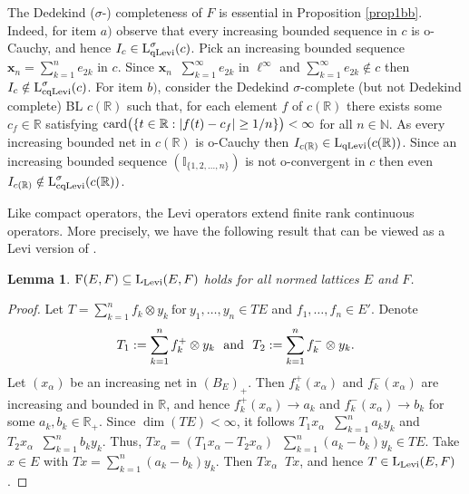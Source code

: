 \documentclass[10pt]{article}
\makeatletter
\newtheorem{lemma}[theorem]{Lemma}
\DeclareMathOperator{\convo}{\xrightarrow[]{o}}
\renewcommand{\subsection}{\@startsection{subsection}{1}
{0pt}{3.25ex plus 1ex minus.2ex}{-1em}{\normalfont\normalsize\bf}}
\makeatother
\begin{document}
{{{\noindent
The Dedekind ($\sigma$-) completeness of $F$ is essential in
Proposition \ref{prop1bb}. Indeed, for item $a)$ observe 
that every increasing bounded sequence in $c$ is o-Cauchy, and hence 
$I_c\in\text{\rm L}^\sigma_{\text{\rm qLevi}}(c)$. Pick an increasing 
bounded sequence $\mathbf{x}_n=\sum\limits_{k=1}^n e_{2k}$ 
in $c$. Since $\mathbf{x}_n\convo\sum\limits_{k=1}^\infty e_{2k}$ in $\ell^\infty$
and $\sum\limits_{k=1}^\infty e_{2k}\notin c$ then
$I_c\notin\text{\rm L}^\sigma_{\text{\rm cqLevi}}(c)$.
For item $b)$, consider the Dedekind $\sigma$-complete 
(but not Dedekind complete) BL $c(\mathbb{R})$
such that, for each element $f$ of $c(\mathbb{R})$ there exists some $c_f\in\mathbb{R}$
satisfying $\text{\rm card}\big(\{t\in\mathbb{R}: |f(t)-c_f|\ge 1/n\}\big)<\infty$
for all $n\in\mathbb{N}$. As every increasing bounded net in $c(\mathbb{R})$ 
is o-Cauchy then $I_{c(\mathbb{R})}\in\text{\rm L}_{\text{\rm qLevi}}(c(\mathbb{R}))$.
Since an increasing bounded sequence $(\mathbb{I}_{\{1,2,...,n\}})$ is not o-convergent in $c$ 
then even $I_{c(\mathbb{R})}\notin\text{\rm L}^\sigma_{\text{\rm cqLevi}}(c(\mathbb{R}))$.

\medskip
Like compact operators, the Levi operators extend finite rank continuous operators. More precisely, we have the following result that 
can be viewed as a Levi version of \cite[Lemma 1~{\it iv})]{E2025-1}.

\begin{lemma}\label{prop1}%
$\text{\rm F}(E,F)\subseteq\text{\rm L}_{\text{\rm Levi}}(E,F)$
holds for all normed lattices $E$ and $F$.
\end{lemma}

\begin{proof}
Let $T = \sum_{k=1}^n f_k \otimes y_k 
   \  \text{for} \   y_1, \dots, y_n \in TE$
and $f_1, \dots, f_n \in E'$. Denote
$$
   T_1:=\sum_{k=1}^n f_k^+ \otimes y_k \ \ \text{\rm and} \ \ 
   T_2:=\sum_{k=1}^n f_k^- \otimes y_k. 
$$
Let $(x_\alpha)$ be an increasing net in $(B_E)_+$. Then $f_k^+(x_\alpha)$ 
and $f_k^-(x_\alpha)$ are increasing and bounded in $\mathbb{R}$, and hence 
$f_k^+(x_\alpha)\to a_k$ and $f_k^-(x_\alpha)\to b_k$
for some $a_k,b_k\in\mathbb{R}_+$. Since $\dim(TE)<\infty$, it follows
$T_1x_\alpha\convo\sum_{k=1}^n a_k y_k$ and $T_2x_\alpha\convo\sum_{k=1}^n b_k y_k$.
Thus,
$Tx_\alpha=(T_1x_\alpha-T_2x_\alpha)\convo\sum_{k=1}^n(a_k-b_k)y_k\in TE$.
Take $x\in E$ with $Tx=\sum_{k=1}^n(a_k-b_k)y_k$. Then $Tx_\alpha\convo Tx$,
and hence $T\in\text{\rm L}_{\text{\rm Levi}}(E,F)$.
\end{proof}

}}}
\end{document}
